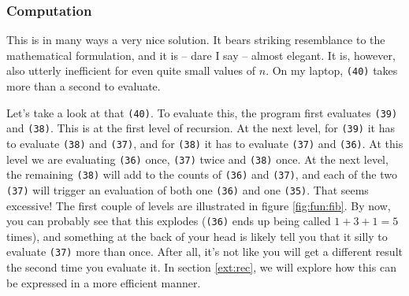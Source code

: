 \subsubsection{Computation}

This is in many ways a very nice solution. It bears striking resemblance to the mathematical formulation, and it is -- dare I say -- almost elegant. It is, however, also utterly inefficient for even quite small values of $n$. On my laptop, \texttt{(40)} takes more than a second to evaluate.

Let's take a look at that \texttt{(40)}. To evaluate this, the program first evaluates \texttt{(39)} and \texttt{(38)}. This is at the first level of recursion. At the next level, for \texttt{(39)} it has to evaluate \texttt{(38)} and \texttt{(37)}, and for \texttt{(38)} it has to evaluate \texttt{(37)} and \texttt{(36)}. At this level we are evaluating \texttt{(36)} once, \texttt{(37)} twice and \texttt{(38)} once. At the next level, the remaining \texttt{(38)} will add to the counts of \texttt{(36)} and \texttt{(37)}, and each of the two \texttt{(37)} will trigger an evaluation of both one \texttt{(36)} and one \texttt{(35)}. That seems excessive! The first couple of levels are illustrated in figure \ref{fig:fun:fib}. By now, you can probably see that this explodes (\texttt{(36)} ends up being called $1+3+1 = 5$ times), and something at the back of your head is likely tell you that it silly to evaluate \texttt{(37)} more than once. After all, it's not like you will get a different result the second time you evaluate it. In section \ref{ext:rec}, we will explore how this can be expressed in a more efficient manner.

